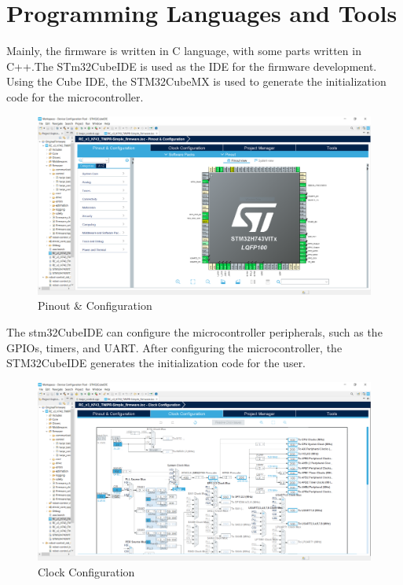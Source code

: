 \section{Programming Languages and Tools}
Mainly, the firmware is written in C language, with some parts written in C++.The STm32CubeIDE is used as the IDE for the firmware development.
Using the Cube IDE, the STM32CubeMX is used to generate the initialization code for the microcontroller.
\begin {figure}[h]
\centering
\includegraphics[width=.8\textwidth]{Pinout & Configuration}
\caption{Pinout \& Configuration}
\label{fig:Pinout}
\end {figure}

The stm32CubeIDE can configure the microcontroller peripherals, such as the GPIOs, timers, and UART. After configuring the microcontroller, the STM32CubeIDE generates the initialization code for the user.
\begin {figure}[h]
\centering
\includegraphics[width=.8\textwidth]{Clock Configuration}
\caption{Clock Configuration}
\label{fig:clock}
\end {figure}

